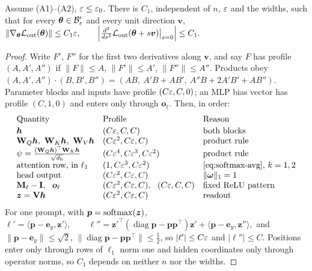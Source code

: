 \begin{lemma}
\label{lem:end-smooth}
Assume (A1)--(A2), $\varepsilon\le\varepsilon_0$. There is $C_1$, independent of $n$, $\varepsilon$ and the widths, such that for every $\bm\theta\in\mathcal B_{\varepsilon}'$ and
every unit direction $\bm v$,
 $\|\nabla_{\bm\theta}\mathcal L_{\mathrm{out}}(\bm\theta)\|\le C_1\varepsilon,\qquad \Bigl|\frac{d^2}{ds^2}\mathcal L_{\mathrm{out}}(\bm\theta+s\bm v)\big|_{s=0}\Bigr|\le C_1 .$ 
\end{lemma}

\begin{proof}
Write $F'$, $F''$ for the first two derivatives along $\bm v$, and say $F$ has profile $(A,A',A'')$ if $\|F\|\le A$, $\|F'\|\le A'$,
$\|F''\|\le A''$. Products obey
 $(A,A',A'')\cdot(B,B',B'')=(AB,\ A'B+AB',\ A''B+2A'B'+AB'').$ 
Parameter blocks and inputs have profile $(C\varepsilon,C,0)$; an MLP bias vector has profile $(C,1,0)$ and enters only through $\bm o_\ell$.
Then, in order:
\[
\begin{array}{@{}lll@{}}
 \text{Quantity} & \text{Profile} & \text{Reason}\\[2pt]
 \bm h & (C\initscale,C,C) & \text{both blocks}\\
 \mathbf W_Q\bm h,\ \mathbf W_K\bm h,\ \mathbf W_V\bm h & (C\initscale^2,C\initscale,C) & \text{product rule}\\
 \psi=\frac{(\mathbf W_Q\bm h)^\top \mathbf W_K\bm h}{\sqrt{d_{\mathrm h}}} & (C\initscale^4,C\initscale^3,C\initscale^2) & \text{product rule}\\
 \text{attention row, in }\ell_1 & (1,C\initscale^3,C\initscale^2) & \text{\cref{eq:softmax-avg}, }k=1,2\\
 \text{head output} & (C\initscale^2,C\initscale,C) & \|\bm\omega\|_1=1\\
 \mathbf M_\ell-\mathbf I,\ \ \bm o_\ell & (C\initscale^2,C\initscale,C),\ \ (C\initscale,C,C) & \text{fixed ReLU pattern}\\
 \bm z=\mathbf V\bm h & (C\initscale^2,C\initscale,C) & \text{readout}
\end{array}
\]
For one prompt, with $\bm p=\operatorname{softmax}(\bm z)$,
 $\ell'=\langle\bm p-\bm e_y,\bm z'\rangle,\qquad \ell''=\bm z'^\top(\operatorname{diag}\bm p-\bm p\bm p^\top)\bm z'+\langle\bm p-\bm e_y,\bm z''\rangle,$ 
and $\|\bm p-\bm e_y\|\le\sqrt2$, $\|\operatorname{diag}\bm p-\bm p\bm p^\top\|\le\frac{1}{2}$, so $|\ell'|\le C\varepsilon$ and $|\ell''|\le C$. Positions enter only through
rows of $\ell_1$ norm one and hidden coordinates only through operator norms, so $C_1$ depends on neither $n$ nor the widths.
\end{proof}

